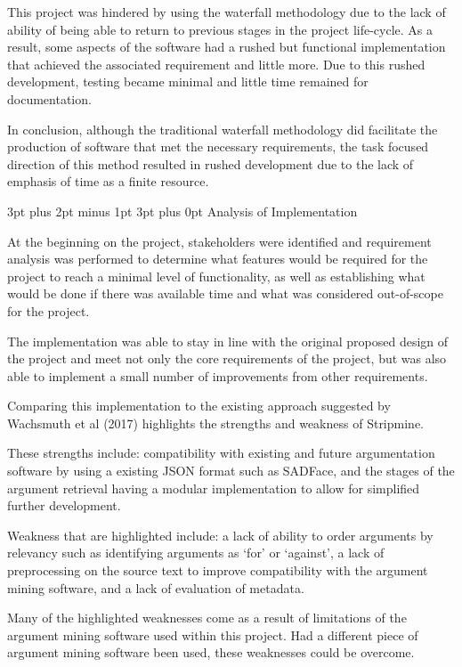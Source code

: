\documentclass[12pt,a4paper]{article}
\makeatletter
\renewcommand\subsection{\@startsection {subsection}{1}{2mm} %
                               {3pt plus 2pt minus 1pt} %
                               {3pt plus 0pt} %
                               {\normalfont\bfseries}}
\makeatother
\begin{document}
This project was hindered by using the waterfall methodology due to the lack of ability of being able to return to previous stages in the project life-cycle. As a result, some aspects of the software had a rushed but functional implementation that achieved the associated requirement and little more. Due to this rushed development, testing became minimal and little time remained for documentation.

In conclusion, although the traditional waterfall methodology did facilitate the production of software that met the necessary requirements, the task focused direction of this method resulted in rushed development due to the lack of emphasis of time as a finite resource. 

\subsection{Analysis of Implementation}

At the beginning on the project, stakeholders were identified and requirement analysis was performed to determine what features would be required for the project to reach a minimal level of functionality, as well as establishing what would be done if there was available time and what was considered out-of-scope for the project.

The implementation was able to stay in line with the original proposed design of the project and meet not only the core requirements of the project, but was also able to implement a small number of improvements from other requirements.

Comparing this implementation to the existing approach suggested by Wachsmuth et al (2017) highlights the strengths and weakness of Stripmine.

These strengths include: compatibility with existing and future argumentation software by using a existing JSON format such as SADFace, and the stages of the argument retrieval having a modular implementation to allow for simplified further development. 

Weakness that are highlighted include: a lack of ability to order arguments by relevancy such as identifying arguments as `for' or `against', a lack of preprocessing on the source text to improve compatibility with the argument mining software, and a lack of evaluation of metadata.

Many of the highlighted weaknesses come as a result of limitations of the argument mining software used within this project. Had a different piece of argument mining software been used, these weaknesses could be overcome.
\end{document}
